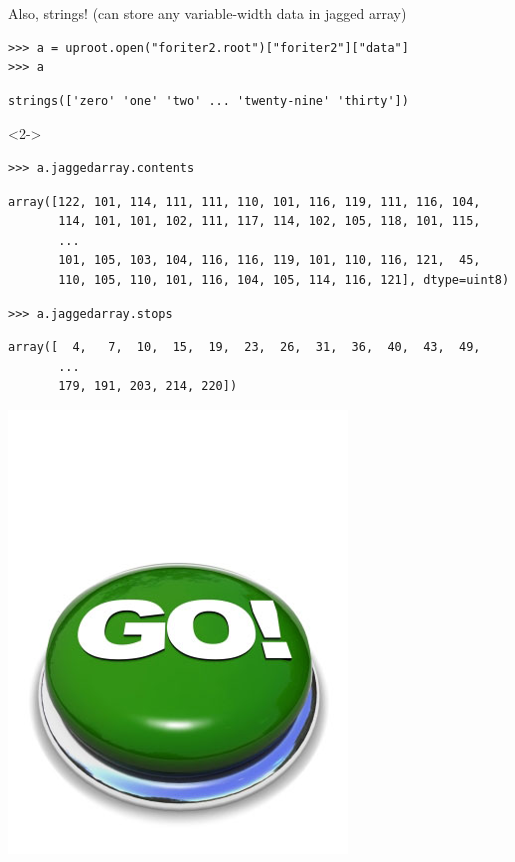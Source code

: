 \documentclass[aspectratio=169]{beamer}
\begin{document}
\begin{frame}[fragile]{Also, strings! (can store any variable-width data in jagged array)}
\vspace{0.5 cm}
\small
\begin{verbatim}
>>> a = uproot.open("foriter2.root")["foriter2"]["data"]
>>> a
\end{verbatim}
\begin{verbatim}
strings(['zero' 'one' 'two' ... 'twenty-nine' 'thirty'])
\end{verbatim}
\begin{uncoverenv}<2->
\begin{verbatim}
>>> a.jaggedarray.contents
\end{verbatim}
\begin{verbatim}
array([122, 101, 114, 111, 111, 110, 101, 116, 119, 111, 116, 104,
       114, 101, 101, 102, 111, 117, 114, 102, 105, 118, 101, 115,
       ...
       101, 105, 103, 104, 116, 116, 119, 101, 110, 116, 121,  45,
       110, 105, 110, 101, 116, 104, 105, 114, 116, 121], dtype=uint8)
\end{verbatim}
\begin{verbatim}
>>> a.jaggedarray.stops
\end{verbatim}
\begin{verbatim}
array([  4,   7,  10,  15,  19,  23,  26,  31,  36,  40,  43,  49,
       ...
       179, 191, 203, 214, 220])
\end{verbatim}
\end{uncoverenv}
\vspace{-7 cm}
\hfill \includegraphics[width=1.5 cm]{safe.png}\hspace{-0.9 cm}
\vspace{7 cm}
\end{frame}
\end{document}
